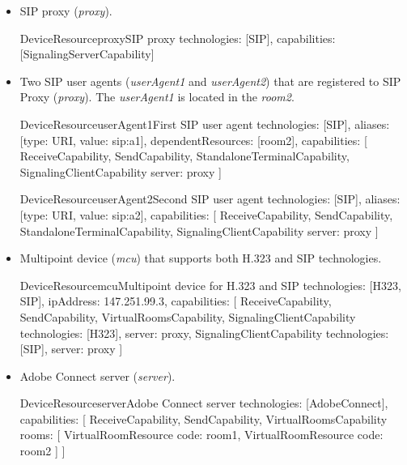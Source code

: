 \begin{itemize}
\item SIP proxy (\emph{proxy}).

\begin{EntityExample}{DeviceResource}{proxy}{SIP proxy}
technologies: [SIP], 
capabilities: [SignalingServerCapability]
\end{EntityExample}

\item Two SIP user agents (\emph{userAgent1} and \emph{userAgent2}) that are
  registered to SIP Proxy (\emph{proxy}). The \emph{userAgent1} is located in
  the \emph{room2}.
  
\begin{EntityExample}{DeviceResource}{userAgent1}{First SIP user agent}
technologies: [SIP],
aliases: [{type: URI, value: sip:a1}],
dependentResources: [room2],
capabilities: [
  ReceiveCapability, SendCapability,
  StandaloneTerminalCapability,
  SignalingClientCapability {server: proxy}
]
\end{EntityExample}

\begin{EntityExample}{DeviceResource}{userAgent2}{Second SIP user agent}
technologies: [SIP],
aliases: [{type: URI, value: sip:a2}],
capabilities: [
  ReceiveCapability, SendCapability,
  StandaloneTerminalCapability,
  SignalingClientCapability {server: proxy}
]
\end{EntityExample}

\item Multipoint device (\emph{mcu}) that supports both H.323 and SIP 
  technologies.
  
\begin{EntityExample}{DeviceResource}{mcu}{Multipoint device for H.323 and SIP}
technologies: [H323, SIP], 
ipAddress: 147.251.99.3,
capabilities: [
  ReceiveCapability, SendCapability,
  VirtualRoomsCapability,
  SignalingClientCapability {technologies: [H323], server: proxy},
  SignalingClientCapability {technologies: [SIP], server: proxy}
]
\end{EntityExample}

\item Adobe Connect server (\emph{server}).

\begin{EntityExample}{DeviceResource}{server}{Adobe Connect server}
technologies: [AdobeConnect],
capabilities: [
  ReceiveCapability, SendCapability,
  VirtualRoomsCapability {rooms: [ 
    VirtualRoomResource {code: room1}, 
    VirtualRoomResource {code: room2}
  ]}
]
\end{EntityExample}


\end{itemize}
